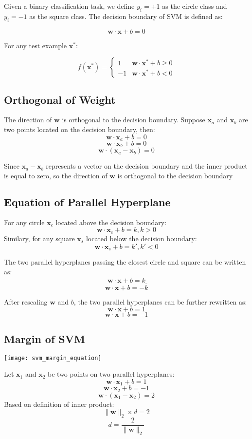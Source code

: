 \begin{multicols*}{2}
\noindent Given a binary classification task, we define $y_i=+1$ as the circle class and $y_i=-1$ as the square class. The decision boundary of SVM is defined as:

$$\mathbf{w} \cdot \mathbf{x} + b = 0$$

\noindent For any test example $\mathbf{x^*}$:

$$
f(\mathbf{x^*}) = 
\begin{cases}
1 & \mathbf{w} \cdot \mathbf{x^*} + b \ge 0 \\
-1 & \mathbf{w} \cdot \mathbf{x^*} + b < 0
\end{cases}
$$

\subsection{Orthogonal of Weight}

\noindent The direction of $\mathbf{w}$ is orthogonal to the decision boundary. Suppose $\mathbf{x}_a$ and $\mathbf{x}_b$ are two points located on the decision boundary, then:
$$\mathbf{w} \cdot \mathbf{x}_a + b = 0$$
$$\mathbf{w} \cdot \mathbf{x}_b + b = 0$$
$$\mathbf{w} \cdot (\mathbf{x}_a -\mathbf{x}_b) = 0$$

\noindent Since $\mathbf{x}_a -\mathbf{x}_b$ represents a vector on the decision boundary and the inner product is equal to zero, so the direction of $\mathbf{w}$ is orthogonal to the decision boundary

\subsection{Equation of Parallel Hyperplane}

\noindent For any circle $\mathbf{x}_c$ located above the decision boundary:
$$\mathbf{w} \cdot \mathbf{x}_c + b = k, k>0$$
\noindent Similary, for any square $\mathbf{x}_s$ located below the decision boundary:
$$\mathbf{w} \cdot \mathbf{x}_s + b = k', k'<0$$

\noindent The two parallel hyperplanes passing the closest circle and square can be written as:
$$\mathbf{w} \cdot \mathbf{x} + b = \bar{k}$$
$$\mathbf{w} \cdot \mathbf{x} + b = -\bar{k}$$

\noindent After rescaling $\mathbf{w}$ and $b$, the two parallel hyperplanes can be further rewritten as:
$$\mathbf{w} \cdot \mathbf{x} + b = 1$$
$$\mathbf{w} \cdot \mathbf{x} + b = -1$$

\subsection{Margin of SVM}
\begin{center}
\texttt{[image: svm\_margin\_equation]}
\end{center}
\noindent Let $\mathbf{x}_1$ and $\mathbf{x}_2$ be two points on two parallel hyperplanes:
$$\mathbf{w} \cdot \mathbf{x}_1 + b = 1$$
$$\mathbf{w} \cdot \mathbf{x}_2 + b = -1$$
$$\mathbf{w} \cdot (\mathbf{x}_1 - \mathbf{x}_2)= 2$$
\noindent Based on definition of inner product:
$$\| \mathbf{w} \|_2 \times d = 2$$
$$d = \frac{2}{\| \mathbf{w} \|_2}$$


\end{multicols*}
